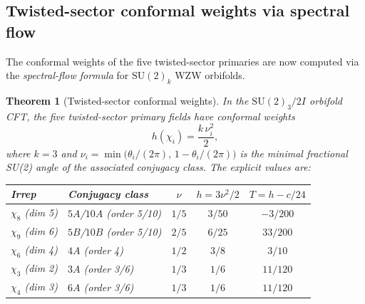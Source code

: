 \documentclass[11pt,a4paper]{article}
\newtheorem{theorem}{Theorem}[section]
\theoremstyle{definition}
\theoremstyle{remark}
\begin{document}
\subsection{Twisted-sector conformal weights via spectral flow}
\label{P5:subsec:twisted_weights}

The conformal weights of the five twisted-sector primaries are now computed
via the \emph{spectral-flow formula} for $\mathrm{SU}(2)_k$ WZW orbifolds.

\begin{theorem}[Twisted-sector conformal weights]
\label{P5:thm:twisted_weights}
In the $\mathrm{SU}(2)_3/2I$ orbifold CFT, the five twisted-sector primary
fields have conformal weights
\begin{equation}
  h(\chi_i) = \frac{k\,\nu_i^2}{2},
  \label{P5:eq:twisted_weights}
\end{equation}
where $k=3$ and $\nu_i = \min\!\bigl(\theta_i/(2\pi),\,1-\theta_i/(2\pi)\bigr)$
is the minimal fractional SU(2) angle of the associated conjugacy class.
The explicit values are:
\begin{center}
\renewcommand{\arraystretch}{1.35}
\begin{tabular}{llccc}
\toprule
Irrep & Conjugacy class & $\nu$ & $h = 3\nu^2/2$ & $T = h - c/24$ \\
\midrule
$\chi_8$ (dim 5) & $5A$/$10A$ (order 5/10) & $1/5$ & $3/50$  & $-3/200$ \\
$\chi_9$ (dim 6) & $5B$/$10B$ (order 5/10) & $2/5$ & $6/25$  & $33/200$ \\
$\chi_6$ (dim 4) & $4A$ (order 4)           & $1/2$ & $3/8$   & $3/10$   \\
$\chi_3$ (dim 2) & $3A$ (order 3/6)         & $1/3$ & $1/6$   & $11/120$ \\
$\chi_4$ (dim 3) & $6A$ (order 3/6)         & $1/3$ & $1/6$   & $11/120$ \\
\bottomrule
\end{tabular}
\end{center}
\end{theorem}
\end{document}
